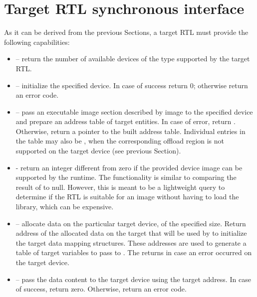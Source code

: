 \section{Target RTL synchronous interface}\label{sc:TargetRTLInterface}

As it can be derived from the previous Sections, a target RTL must provide the following capabilities:

\begin{itemize}
  \item {} – return the number of available devices of the type supported by the target RTL.

  \item {} – initialize the specified device. In case of success return 0; otherwise return an error code. 

  \item {} – pass an executable image section described by image to the specified device and prepare an address table of target entities. In case of error, return . Otherwise, return a pointer to the built address table. Individual entries in the table may also be , when the corresponding offload region is not supported on the target device (see previous Section).
  
  \item {} - return an integer different from zero if the provided device image can be supported by the runtime. The functionality is similar to comparing the result of  to null. However, this is meant to be a lightweight query to determine if the RTL is suitable for an image without having to load the library, which can be expensive.

  \item {} – allocate data on the particular target device, of the specified size. Return address of the allocated data on the target that will be used by \libomptarget{}to initialize the target data mapping structures. These addresses are used to generate a table of target variables to pass to . The returns  in case an error occurred on the target device.

  \item {} – pass the data content to the target device using the target address. In case of success, return zero. Otherwise, return an error code.


\end{itemize}
